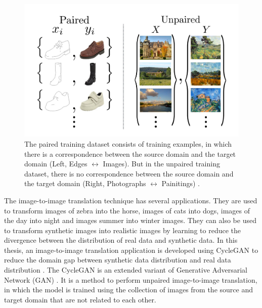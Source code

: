 \begin{figure}
        \begin{center}
	    \includegraphics[scale=0.50]{images/Introduction/pairedUnpaired.JPG}
	    \caption[Examples of the paired training dataset and the unpaired training dataset.]{The paired training dataset consists of training examples, in which there is a correspondence between the source domain and the target domain (Left, Edges $\leftrightarrow$ Images). But in the unpaired training dataset, there is no correspondence between the source domain and the target domain (Right, Photographs $\leftrightarrow$ Painitings) \cite{zhu2020unpaired}.}
	    \label{fig:pairedUnpaired}
	    \end{center}
\end{figure}

\newpage
The image-to-image translation technique has several applications. They are used to transform images of zebra into the horse, images of cats into dogs, images of the day into night and images summer into winter images. They can also be used to transform synthetic images into realistic images by learning to reduce the divergence between the distribution of real data and synthetic data. In this thesis, an image-to-image translation application is developed using \ac{CycleGAN} to reduce the domain gap between synthetic data distribution and real data distribution \cite{zhu2020unpaired}. The \ac{CycleGAN} is an extended variant of Generative Adversarial Network (\ac{GAN}) \cite{goodfellow2014generative}. It is a method to perform unpaired image-to-image translation, in which the model is trained using the collection of images from the source and target domain that are not related to each other\footnotemark.

